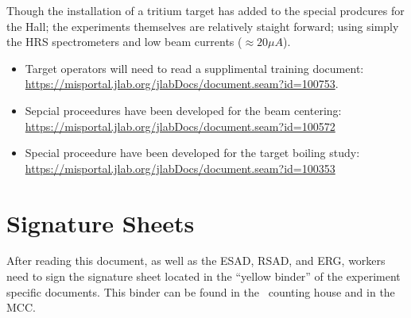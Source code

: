 Though the installation of a tritium target has added to the special prodcures for
the Hall; the experiments themselves are relatively staight forward; using  
simply the HRS spectrometers and low beam currents ($\approx 20 \mu A$). 

\begin{itemize}

\item{
Target operators will need to read a supplimental training document:
\url{https://misportal.jlab.org/jlabDocs/document.seam?id=100753}.
}

\item{
Sepcial proceedures have been developed for the beam centering:
\url{ https://misportal.jlab.org/jlabDocs/document.seam?id=100572}
}

\item{
Special proceedure have been developed for the target boiling study:
\url{https://misportal.jlab.org/jlabDocs/document.seam?id=100353}
}

\end{itemize}


\newpage
\section{Signature Sheets}

After reading this document, as well as the ESAD, RSAD, and ERG, workers need to sign
the signature sheet located in the ``yellow binder'' of the experiment specific documents.
This binder can be found in the \HALL\ counting house and in the MCC.

